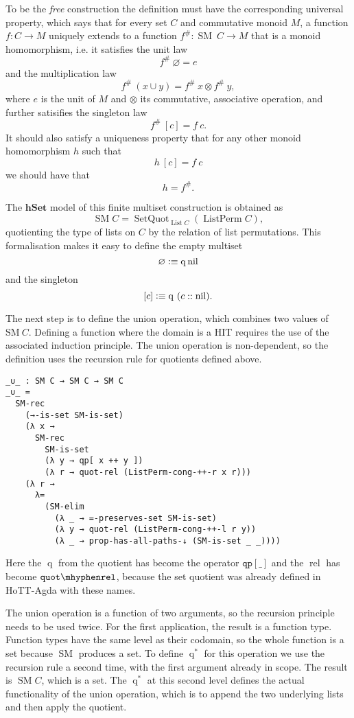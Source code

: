 \documentclass[12pt, parskip, DIV=14]{scrbook}
\newcommand{\defeq}{\vcentcolon\equiv}
\newcommand{\SM}{\operatorname{SM}}
\newcommand{\hSet}{\mathbf{hSet}}
\newcommand{\List}{\operatorname{List}}
\newcommand{\q}{\operatorname{q}}
\newcommand{\rel}{\operatorname{rel}}
\newcommand{\qs}{\operatorname{q}^*}
\newcommand{\ListPerm}{\operatorname{ListPerm}}
\newcommand{\nil}{\operatorname{nil}}
\begin{document}
To be the \textit{free} construction the definition must have the corresponding universal property, which says that for every set $C$ and commutative monoid $M$, a function $f : C \to M$ uniquely extends to a function $f^\# : \SM~C \to M$ that is a monoid homomorphism, i.e. it satisfies the unit law $$f^\#~\varnothing = e$$ and the multiplication law $$f^\#~(x \cup y) = f^\#~x \otimes f^\#~y,$$ where $e$ is the unit of $M$ and $\otimes$ its commutative, associative operation, and further satisifies the singleton law
$$f^\#~[c] = f~c.$$ It should also satisfy a uniqueness property that for any other monoid homomorphism $h$ such that
$$h~[c] = f~c$$ we should have that $$h = f^\#.$$

The $\hSet$ model of this finite multiset construction is obtained as
$$\SM C = \operatorname{SetQuot}_{\List C}(\ListPerm C),$$ quotienting the type of lists on $C$ by the relation of list permutations. This formalisation makes it easy to define the empty multiset
$$\varnothing \defeq \q \nil$$ and the singleton $$[c] \defeq \q~(c :: \nil).$$

The next step is to define the union operation, which combines two values of $\mathrm{SM}~C$. Defining a function where the domain is a HIT requires the use of the associated induction principle. The union operation is non-dependent, so the definition uses the recursion rule for quotients defined above.
\begin{verbatim}
_∪_ : SM C → SM C → SM C
_∪_ =
  SM-rec
    (→-is-set SM-is-set)
    (λ x →
      SM-rec
        SM-is-set
        (λ y → qp[ x ++ y ])
        (λ r → quot-rel (ListPerm-cong-++-r x r)))
    (λ r →
      λ=
        (SM-elim
          (λ _ → =-preserves-set SM-is-set)
          (λ y → quot-rel (ListPerm-cong-++-l r y))
          (λ _ → prop-has-all-paths-↓ (SM-is-set _ _))))
\end{verbatim}
Here the $\q$ from the quotient has become the operator $\mathtt{qp[\_]}$ and the $\rel$ has become $\mathtt{quot\mhyphen rel}$, because the set quotient was already defined in HoTT-Agda with these names.

The union operation is a function of two arguments, so the recursion principle needs to be used twice. For the first application, the result is a function type. Function types have the same level as their codomain, so the whole function is a set because $\SM$ produces a set. To define $\qs$ for this operation we use the recursion rule a second time, with the first argument already in scope. The result is $\SM C$, which is a set. The $\qs$ at this second level defines the actual functionality of the union operation, which is to append the two underlying lists and then apply the quotient.
\end{document}
